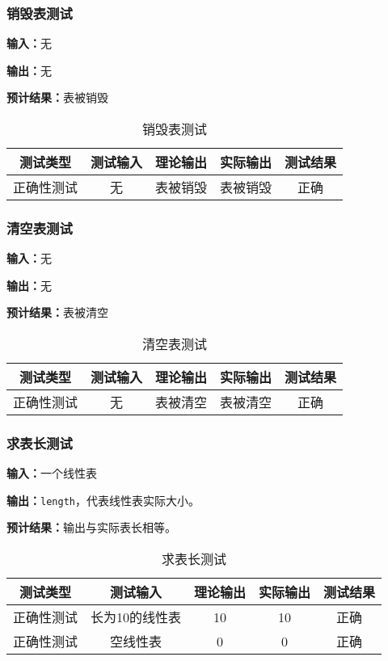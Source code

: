 \subsubsection{销毁表测试}
\textbf{输入：}无
\par
\textbf{输出：}无
\par
\textbf{预计结果：}表被销毁
\begin{table}[h]
\caption{销毁表测试}
\centering
\begin{tabular}{@{}ccccc@{}}
\toprule
\multicolumn{1}{c}{测试类型}    & \multicolumn{1}{c}{测试输入} & \multicolumn{1}{c}{理论输出} & \multicolumn{1}{c}{实际输出} & \multicolumn{1}{c}{测试结果} \\ \midrule
\multicolumn{1}{c|}{正确性测试}  & 无&表被销毁&表被销毁&正确\\ \bottomrule
\end{tabular}
\label{tab:destorytest1}
\end{table}

\subsubsection{清空表测试}
\textbf{输入：}无
\par
\textbf{输出：}无
\par
\textbf{预计结果：}表被清空
\begin{table}[h]
    \centering
    \caption{清空表测试}
    \begin{tabular}{@{}ccccc@{}}
        \toprule
        \multicolumn{1}{c}{测试类型}    & \multicolumn{1}{c}{测试输入} & \multicolumn{1}{c}{理论输出} & \multicolumn{1}{c}{实际输出} &
        \multicolumn{1}{c}{测试结果} \\ \midrule
        \multicolumn{1}{c|}{正确性测试}  &无 &表被清空&表被清空&正确\\ \bottomrule
    \end{tabular}
    \label{tab:cleartest1}
\end{table}


\subsubsection{求表长测试}
\textbf{输入：}一个线性表
\par
\textbf{输出：}\texttt{length}，代表线性表实际大小。
\par
\textbf{预计结果：}输出与实际表长相等。
\begin{table}[h]
    \centering
    \caption{求表长测试}
    \begin{tabular}{@{}ccccc@{}}
        \toprule
        \multicolumn{1}{c}{测试类型}    & \multicolumn{1}{c}{测试输入} & \multicolumn{1}{c}{理论输出} & \multicolumn{1}{c}{实际输出} &
        \multicolumn{1}{c}{测试结果} \\ \midrule
        \multicolumn{1}{c|}{正确性测试}  & 长为10的线性表&10&10&正确\\
        \multicolumn{1}{c|}{正确性测试}  & 空线性表&0&0&正确\\ \bottomrule
    \end{tabular}
    \label{tab:lengthtest1}
\end{table}

